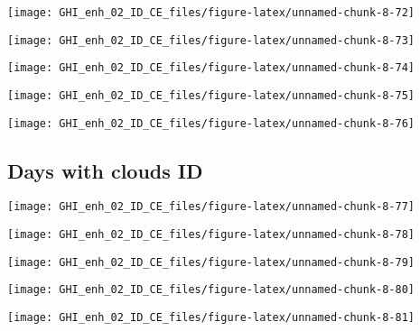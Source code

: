 \documentclass[
  10pt,
  a4paper,oneside]{article}
\begin{document}
\begin{center}\texttt{[image: GHI\_enh\_02\_ID\_CE\_files/figure-latex/unnamed-chunk-8-72]} \end{center}

\begin{center}\texttt{[image: GHI\_enh\_02\_ID\_CE\_files/figure-latex/unnamed-chunk-8-73]} \end{center}

\begin{center}\texttt{[image: GHI\_enh\_02\_ID\_CE\_files/figure-latex/unnamed-chunk-8-74]} \end{center}

\begin{center}\texttt{[image: GHI\_enh\_02\_ID\_CE\_files/figure-latex/unnamed-chunk-8-75]} \end{center}

\begin{center}\texttt{[image: GHI\_enh\_02\_ID\_CE\_files/figure-latex/unnamed-chunk-8-76]} \end{center}

\FloatBarrier

\hypertarget{days-with-clouds-id}{%
\subsection{Days with clouds ID}\label{days-with-clouds-id}}

\begin{center}\texttt{[image: GHI\_enh\_02\_ID\_CE\_files/figure-latex/unnamed-chunk-8-77]} \end{center}

\begin{center}\texttt{[image: GHI\_enh\_02\_ID\_CE\_files/figure-latex/unnamed-chunk-8-78]} \end{center}

\begin{center}\texttt{[image: GHI\_enh\_02\_ID\_CE\_files/figure-latex/unnamed-chunk-8-79]} \end{center}

\begin{center}\texttt{[image: GHI\_enh\_02\_ID\_CE\_files/figure-latex/unnamed-chunk-8-80]} \end{center}

\begin{center}\texttt{[image: GHI\_enh\_02\_ID\_CE\_files/figure-latex/unnamed-chunk-8-81]} \end{center}
\end{document}
